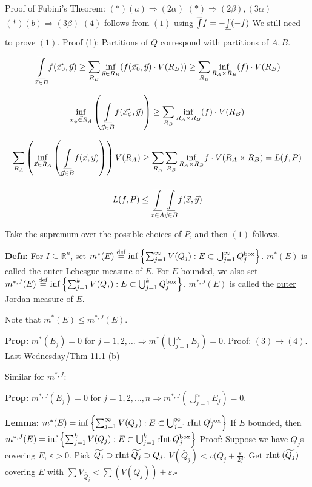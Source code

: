 \documentclass[10pt,letterpaper]{article}
\newcommand{\n}{\hfill\break}
\newcommand{\lemma}[1]{\par\noindent\settowidth{\hangindent}{\textbf{Lemma: }}\textbf{Lemma: }#1}
\newcommand{\defn}[1]{\par\noindent\settowidth{\hangindent}{\textbf{Defn: }}\textbf{Defn: }#1\n}
\newcommand{\prop}[1]{\par\noindent\settowidth{\hangindent}{\textbf{Prop: }}\textbf{Prop: }#1\n}
\newcommand{\proven}{\;$\square$\n}
\newcommand{\ptxt}[1]{\textrm{\textnormal{#1}}}
\newcommand{\set}[1]{\left\{#1\right\}}
\newcommand{\reals}{\mathbb{R}}
\newcommand{\R}{\reals}
\renewcommand{\epsilon}{\varepsilon}
\newcommand{\rInt}{\ptxt{rInt}\>}
\newcommand{\lint}[2]{\underset{#1}{\overset{#2}{{\color{black}\underline{{\color{white}\overline{{\color{black}\int}}\color{black}}}}}}}
\newcommand{\uint}[2]{\underset{#1}{\overset{#2}{{\color{white}\underline{{\color{black}\overline{{\color{black}\int}}\color{black}}}}}}}
\begin{document}
\par\noindent Proof of Fubini's Theorem:\n
$(*)(a)\Rightarrow(2\alpha)$\n
$(*)\Rightarrow(2\beta),(3\alpha)$\n
$(*)(b)\Rightarrow(3\beta)$\n
$(4)$ follows from $(1)$ using $\uint{}{}f=-\lint{}{}(-f)$\n
We still need to prove $(1)$.\n
\n
Proof (1): Partitions of $Q$ correspond with partitions of $A,B$.
\[
\lint{\vec{x}\in{}B}{}f(\vec{x_{0}},\vec{y})\ge\sum_{R_{B}}\underset{\vec{y}\in{}R_{B}}{\inf}(f(\vec{x_{0}},\vec{y})\cdot{}V(R_{B}))\ge\sum_{R_{B}}\underset{R_{A}\times{}R_{B}}{\inf}(f)\cdot{}V(R_{B})
\]

\[
\underset{\vec{x_{\phi}\in{}R_{A}}}{\inf}\left(\lint{\vec{y}\in{}B}{}f(\vec{x_{\phi}},\vec{y})\right)\ge\sum_{R_{B}}\underset{R_{A}\times{}R_{B}}{\inf}(f)\cdot{}V(R_{B})
\]

\[
\sum_{R_{A}}\left(\underset{\vec{x}\in{}R_{A}}{\inf}\left( \lint{\vec{y}\in{}B}{}f(\vec{x},\vec{y})\right) \right)V(R_{A})\ge\sum_{R_{A}}\sum_{R_{B}}\underset{R_{A}\times{}R_{B}}{\inf}f\cdot{}V(R_{A}\times{}R_{B})=L(f,P)
\]

\[
L(f,P)\le\lint{\vec{x}\in{}A}{}\lint{\vec{y}\in{}B}{}f(\vec{x},\vec{y})
\]

\par\noindent Take the supremum over the possible choices of $P$, and then $(1)$ follows.\n

\defn{For $I\subseteq\R^{n}$, set $m^{*}(E)\overset{\ptxt{def}}{=}\inf\set{\sum_{j=1}^{\infty}V(Q_{j}):E\subset\bigcup_{j=1}^{\infty}Q_{j}^{\ptxt{box}}}$.\n
$m^{*}(E)$ is called the \underline{outer Lebesgue measure} of $E$.\n
\n
For $E$ bounded, we also set $m^{*,J}(E)\overset{\ptxt{def}}{=}\inf\set{\sum_{j=1}^{k}V(Q_{j}):E\subset\bigcup_{j=1}^{k}Q_{j}^{\ptxt{box}}}$.\n
$m^{*,J}(E)$ is called the \underline{outer Jordan measure} of $E$.\n}

\par\noindent Note that $m^{*}(E)\le{}m^{*,J}(E)$.\n

\prop{$m^{*}(E_{j})=0$ for $j=1,2,\ldots\Rightarrow{}m^{*}(\bigcup_{j=1}^{\infty}E_{j})=0$.\n
Proof: $(3)\to{}(4)$. Last Wednesday/Thm 11.1 (b)\n}

\par\noindent Similar for $m^{*,J}$:
\prop{$m^{*,J}(E_{j})=0$ for $j=1,2,\ldots,n\Rightarrow{}m^{*,J}(\bigcup_{j=1}^{n}E_{j})=0$.}

\lemma{$m^{*}(E)=\inf\set{\sum_{j=1}^{\infty}V(Q_{j}):E\subset\bigcup_{j=1}^{\infty}\rInt{}Q_{j}^{\ptxt{box}}}$\n
If $E$ bounded, then $m^{*,J}(E)=\inf\set{\sum_{j=1}^{k}V(Q_{j}):E\subset\bigcup_{j=1}^{k}\rInt{}Q_{j}^{\ptxt{box}}}$\n
Proof: Suppose we have $Q_{j}$s covering $E$, $\epsilon>0$.\n
Pick $\widetilde{Q_{j}}\supset\rInt\widetilde{Q_{j}}\supset{}Q_{j}$, $V(\widetilde{Q_{j}})<v(Q_{j}+\frac{\epsilon}{2j}$.\n
Get $\rInt(\widetilde{Q_{j}})$ covering $E$ with $\sum{}V_{\widetilde{Q_{j}}}<\sum(V(Q_{j}))+\epsilon$.\proven}
\end{document}
